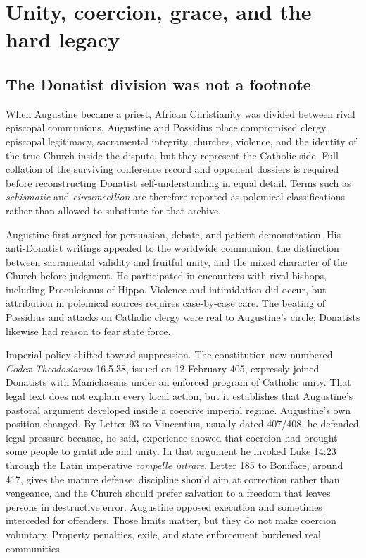 \section{Unity, coercion, grace, and the hard legacy}\label{sec:aug-controversies}

\subsection{The Donatist division was not a footnote}

When Augustine became a priest, African Christianity was divided between
rival episcopal communions. Augustine and Possidius place compromised clergy,
episcopal legitimacy, sacramental integrity, churches, violence, and the
identity of the true Church inside the dispute, but they represent the
Catholic side. Full collation of the surviving conference record and opponent
dossiers is required before reconstructing Donatist self-understanding in
equal detail. Terms such
as \emph{schismatic} and \emph{circumcellion} are therefore reported as
polemical classifications rather than allowed to substitute for that archive.

Augustine first argued for persuasion, debate, and patient demonstration. His
anti-Donatist writings appealed to the worldwide communion, the distinction
between sacramental validity and fruitful unity, and the mixed character of
the Church before judgment. He participated in encounters with rival bishops,
including Proculeianus of Hippo. Violence and intimidation did occur, but
attribution in polemical sources requires case-by-case care. The beating of
Possidius and attacks on Catholic clergy were real to Augustine's circle;
Donatists likewise had reason to fear state force.

Imperial policy shifted toward suppression. The constitution now numbered
\emph{Codex Theodosianus} 16.5.38, issued on 12 February 405, expressly joined
Donatists with Manichaeans under an enforced program of Catholic unity. That
legal text does not explain every local action, but it establishes that
Augustine's pastoral argument developed inside a coercive imperial regime.
Augustine's own position changed.
By Letter 93 to Vincentius, usually dated 407/408, he defended legal pressure
because, he said, experience showed that coercion had brought some people to
gratitude and unity. In that argument he invoked Luke 14:23 through the Latin
imperative \emph{compelle intrare}. Letter 185 to Boniface, around 417, gives the mature defense: discipline
should aim at correction rather than vengeance, and the Church should prefer
salvation to a freedom that leaves persons in destructive error. Augustine
opposed execution and sometimes interceded for offenders. Those limits matter,
but they do not make coercion voluntary. Property penalties, exile, and state
enforcement burdened real communities.

